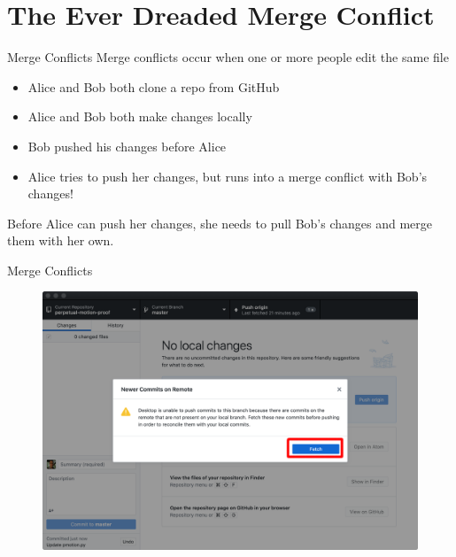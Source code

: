 \documentclass{beamer}
\begin{document}
    \section{The Ever Dreaded Merge Conflict}\label{sec:the-ever-dreaded-merge-conflict}
    \begin{frame}{Merge Conflicts}
        Merge conflicts occur when one or more people edit the same file
        \begin{itemize}
            \item Alice and Bob both clone a repo from GitHub
            \item Alice and Bob both make changes locally
            \item Bob pushed his changes before Alice
            \item Alice tries to push her changes, but runs into a merge conflict with Bob's changes!
        \end{itemize}
        Before Alice can push her changes, she needs to pull Bob's changes and merge them with her own.
    \end{frame}

    \begin{frame}{Merge Conflicts}
        \begin{figure}
            \centering
            \includegraphics[width=\textwidth]{figures/merge_1.png}
        \end{figure}
    \end{frame}
\end{document}
